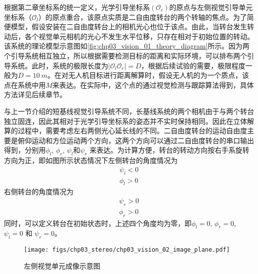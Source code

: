 根据第二章坐标系的统一定义，光学引导坐标系$(\mathcal{O}_c)$的原点与左侧视觉引导单元坐标系（$\mathcal{O}_l$）的原点重合，该原点实质是二自由度转台的两个转轴的焦点。为了简便模型，假设安装在二自由度转台上的相机光心也位于该点。由此，当转台发生转动后，各个视觉单元相机的光心不发生水平位移，只存在相对于初始位置的转动。该系统的理论模型示意图如\ref{fig:chp03_vision_01_theory_diagram}所示。因为两个引导系统相互独立，所以根据需要检测目标的距离和实际环境，可以排布两个引导系统。此时，系统的极限长度为$|\mathcal{O}_l\mathcal{O}_r| = D$，根据后续试验的需要，极限程度一般为$D = 10\ m$。在对无人机目标进行距离解算时，假设无人机的为一个质点，该点在系统中用$M$来表达。在实际中，这个点的通过视觉检测与跟踪算法得到，具体方法详见后续章节。

与上一节介绍的短基线视觉引导系统不同，长基线系统的两个相机由于与两个转台独立固连，因此其相对于光学引导坐标系的姿态并不实时保持相同。因此在立体解算的过程中，需要考虑左右两侧光心延长线的不同。二自由度转台的运动自由度主要是俯仰运动和方位运动两个方向，这两个方向可以通过二自由度转台的串口输出得到，分别用${\phi_l}$, ${\phi_r}$, ${\psi_l}$和${\psi_r}$ 来表达。为计算方便，转台的转动方向按右手系旋转方向为正，即如图所示状态情况下左侧转台的角度情况为
\begin{align}
\psi_l < 0 \\
\phi_l > 0
\end{align}
右侧转台的角度情况为
\begin{align}
\psi_r > 0 \\
\phi_r > 0
\end{align}
同时，可以定义转台在初始状态时，上述四个角度均为零，即$\phi_l= 0$, $\phi_r=0$, ${\psi_l=0}$ 和 ${\psi_r=0}$。


\begin{figure}[!tb]
	\centering
	\texttt{[image: figs/chp03\_stereo/chp03\_vision\_02\_image\_plane.pdf]}	
	\caption{左侧视觉单元成像示意图}
	\label{fig:chp03_vision_02_image_plane}
\end{figure}

